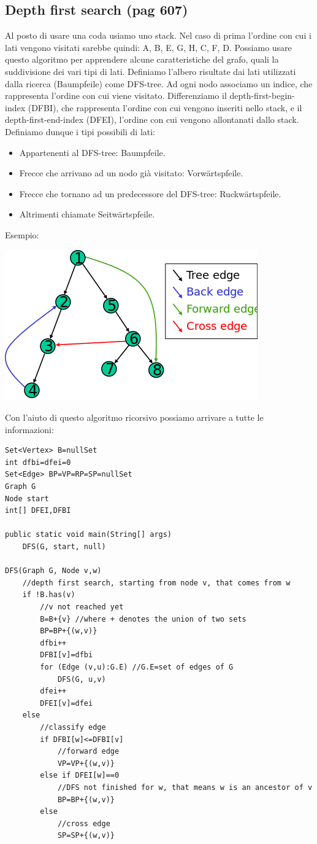 \documentclass[a4paper]{book}
\begin{document}
\subsection{Depth first search (pag 607)}
Al posto di usare una coda usiamo uno stack. Nel caso di prima l'ordine con cui i lati vengono visitati sarebbe quindi: A, B, E, G, H, C, F, D. Possiamo usare questo algoritmo per apprendere alcune caratteristiche del grafo, quali la suddivisione dei vari tipi di lati. Definiamo l'albero risultate dai lati utilizzati dalla ricerca (Baumpfeile) come DFS-tree. Ad ogni nodo associamo un indice, che rappresenta l'ordine con cui viene visitato. Differenziamo il depth-first-begin-index (DFBI), che rappresenta l'ordine con cui vengono inseriti nello stack, e il depth-first-end-index (DFEI), l'ordine con cui vengono allontanati dallo stack. Definiamo dunque i tipi possibili di lati:
\begin{itemize}
\item Appartenenti al DFS-tree: Baumpfeile.
\item Frecce che arrivano ad un nodo già visitato: Vorwärtspfeile.
\item Frecce che tornano ad un predecessore del DFS-tree: Ruckwärtspfeile.
\item Altrimenti chiamate Seitwärtspfeile.
\end{itemize}
Esempio:
\begin{center}
\includegraphics[scale=0.7]{Figures/edgetype.png}
\end{center}
Con l'aiuto di questo algoritmo ricorsivo possiamo arrivare a tutte le informazioni:
\begin{lstlisting}
Set<Vertex> B=nullSet
int dfbi=dfei=0
Set<Edge> BP=VP=RP=SP=nullSet
Graph G
Node start
int[] DFEI,DFBI

public static void main(String[] args)
	DFS(G, start, null)

DFS(Graph G, Node v,w)
	//depth first search, starting from node v, that comes from w
	if !B.has(v)
		//v not reached yet
		B=B+{v} //where + denotes the union of two sets
		BP=BP+{(w,v)}
		dfbi++
		DFBI[v]=dfbi
		for (Edge (v,u):G.E) //G.E=set of edges of G
			DFS(G, u,v)
		dfei++
		DFEI[v]=dfei
	else
		//classify edge
		if DFBI[w]<=DFBI[v]
			//forward edge
			VP=VP+{(w,v)}
		else if DFEI[w]==0 
			//DFS not finished for w, that means w is an ancestor of v
			BP=BP+{(w,v)}
		else
			//cross edge
			SP=SP+{(w,v)}			
\end{lstlisting}
\end{document}
